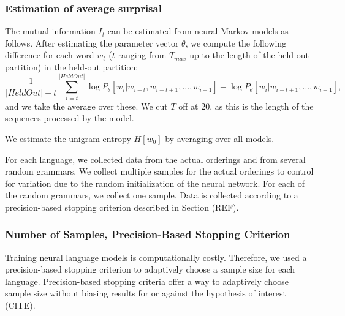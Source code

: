 \documentclass[11pt,letterpaper]{article}
\newcommand\mhahn[1]{{\color{red}(#1)}}
\newcounter{theorem}
\begin{document}
\subsubsection{Estimation of average surprisal}

The mutual information $I_t$ can be estimated from neural Markov models as follows.
After estimating the parameter vector $\theta$, we compute the following difference for each word $w_t$ ($t$ ranging from $T_{max}$ up to the length of the held-out partition) in the held-out partition:
\begin{equation}
	\frac{1}{|HeldOut|-t} \sum_{i=t}^{|HeldOut|} \log P_\theta[w_i | w_{i-t}, w_{i-t+1}, ..., w_{i-1}] - \log P_\theta[w_i | w_{i-t+1}, ..., w_{i-1}],
\end{equation}
and we take the average over these.
We cut $T$ off at 20, as this is the length of the sequences processed by the model.


We estimate the unigram entropy $H[w_0]$ by averaging over all models.

For each language, we collected data from the actual orderings and from several random grammars.
We collect multiple samples for the actual orderings to control for variation due to the random initialization of the neural network.
For each of the random grammars, we collect one sample.
Data is collected according to a precision-based stopping criterion described in Section (REF).






\subsubsection{Number of Samples, Precision-Based Stopping Criterion}
Training neural language models is computationally costly.
Therefore, we used a precision-based stopping criterion to adaptively choose a sample size for each language.
Precision-based stopping criteria offer a way to adaptively choose sample size without biasing results for or against the hypothesis of interest (CITE).
\end{document}
